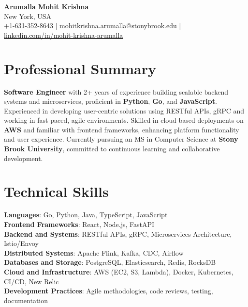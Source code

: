 \documentclass[letterpaper,11pt]{article}
\begin{document}
\begin{center}
  {\Large \textbf{Arumalla Mohit Krishna}} \\
  New York, USA \\
  +1-631-352-8643 \enspace | \enspace mohitkrishna.arumalla@stonybrook.edu \enspace | \enspace \href{https://www.linkedin.com/in/mohit-krishna-arumalla}{linkedin.com/in/mohit-krishna-arumalla}
\end{center}

\section{Professional Summary}
  \begin{itemize}[leftmargin=0.15in, label={}]
    \small{\item{
     \textbf{Software Engineer} with 2+ years of experience building scalable backend systems and microservices, proficient in \textbf{Python}, \textbf{Go}, and \textbf{JavaScript}. Experienced in developing user-centric solutions using RESTful APIs, gRPC and working in fast-paced, agile environments. Skilled in cloud-based deployments on \textbf{AWS} and familiar with frontend frameworks, enhancing platform functionality and user experience. Currently pursuing an MS in Computer Science at \textbf{Stony Brook University}, committed to continuous learning and collaborative development.
    }}
  \end{itemize}
\vspace{-16pt}

\section{Technical Skills}
 \begin{itemize}[leftmargin=0.15in, label={}]
    \small{\item{
     \textbf{Languages}: Go, Python, Java, TypeScript, JavaScript \\
     \textbf{Frontend Frameworks}: React, Node.js, FastAPI \\
     \textbf{Backend and Systems}: RESTful APIs, gRPC, Microservices Architecture, Istio/Envoy \\
     \textbf{Distributed Systems}: Apache Flink, Kafka, CDC, Airflow \\
     \textbf{Databases and Storage}: PostgreSQL, Elasticsearch, Redis, RocksDB \\
     \textbf{Cloud and Infrastructure}: AWS (EC2, S3, Lambda), Docker, Kubernetes, CI/CD, New Relic \\
     \textbf{Development Practices}: Agile methodologies, code reviews, testing, documentation
    }}
 \end{itemize}
\vspace{-16pt}
\end{document}

